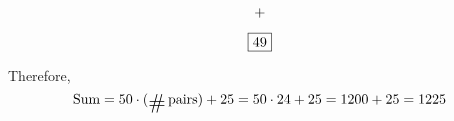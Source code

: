 \begin{example}[additive]
\[\begin{tikzcd}[column sep=0.01pt]
                                                                                         &   &                                                                                        &   &        &   &                                                                                 &   & +           \\[-0.2in]
                                                                                         &   &                                                                                        &   &        &   &                                                                                 &   & \fbox{$49$}
\end{tikzcd}\]
Therefore, 
\[\textnormal{Sum}= 50\cdot(\card\,\text{pairs}) + 25 = 50\cdot 24 + 25 = 1200 + 25 = 1225\]
\end{example}

\vspace*{1.5em}

